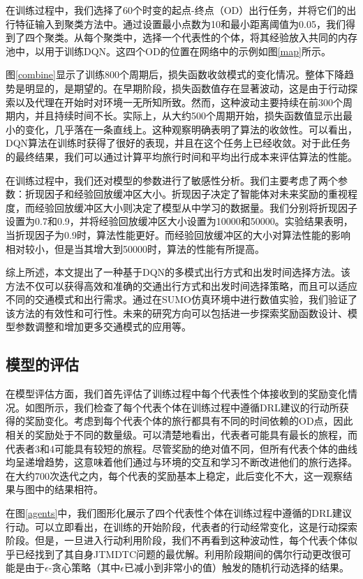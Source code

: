 在训练过程中，我们选择了60个时变的起点-终点（OD）出行任务，并将它们的出行特征输入到聚类方法中。通过设置最小点数为10和最小距离阈值为0.05，我们得到了四个聚类。从每个聚类中，选择一个代表性的个体，将其经验放入共同的内存池中，以用于训练DQN。这四个OD的位置在网络中的示例如图\ref{map}所示。

图\ref{combine}显示了训练800个周期后，损失函数收敛模式的变化情况。整体下降趋势是明显的，是期望的。在早期阶段，损失函数值存在显著波动，这是由于行动探索以及代理在开始时对环境一无所知所致。然而，这种波动主要持续在前300个周期内，并且持续时间不长。实际上，从大约500个周期开始，损失函数值显示出最小的变化，几乎落在一条直线上。这种观察明确表明了算法的收敛性。可以看出，DQN算法在训练时获得了很好的表现，并且在这个任务上已经收敛。对于此任务的最终结果，我们可以通过计算平均旅行时间和平均出行成本来评估算法的性能。

在训练过程中，我们还对模型的参数进行了敏感性分析。我们主要考虑了两个参数：折现因子和经验回放缓冲区大小。折现因子决定了智能体对未来奖励的重视程度，而经验回放缓冲区大小则决定了模型从中学习的数据量。我们分别将折现因子设置为0.7和0.9，并将经验回放缓冲区大小设置为10000和50000。实验结果表明，当折现因子为0.9时，算法性能更好。而经验回放缓冲区的大小对算法性能的影响相对较小，但是当其增大到50000时，算法的性能有所提高。

综上所述，本文提出了一种基于DQN的多模式出行方式和出发时间选择方法。该方法不仅可以获得高效和准确的交通出行方式和出发时间选择策略，而且可以适应不同的交通模式和出行需求。通过在SUMO仿真环境中进行数值实验，我们验证了该方法的有效性和可行性。未来的研究方向可以包括进一步探索奖励函数设计、模型参数调整和增加更多交通模式的应用等。
\subsection{模型的评估}

在模型评估方面，我们首先评估了训练过程中每个代表性个体接收到的奖励变化情况。如图所示，我们检查了每个代表个体在训练过程中遵循DRL建议的行动所获得的奖励变化。考虑到每个代表个体的旅行都具有不同的时间依赖的OD点，因此相关的奖励处于不同的数量级。可以清楚地看出，代表者可能具有最长的旅程，而代表者3和4可能具有较短的旅程。尽管奖励的绝对值不同，但所有代表个体的曲线均呈递增趋势，这意味着他们通过与环境的交互和学习不断改进他们的旅行选择。在大约700次迭代之内，每个代表的奖励基本上稳定，此后变化不大，这一观察结果与图中的结果相符。

在图\ref{agents}中，我们图形化展示了四个代表性个体在训练过程中遵循的DRL建议行动。可以立即看出，在训练的开始阶段，代表者的行动经常变化，这是行动探索阶段。但是，一旦进入行动利用阶段，我们不再看到这种波动性，每个代表个体似乎已经找到了其自身JTMDTC问题的最优解。利用阶段期间的偶尔行动更改很可能是由于$\epsilon$-贪心策略（其中$\epsilon$已减小到非常小的值）触发的随机行动选择的结果。

